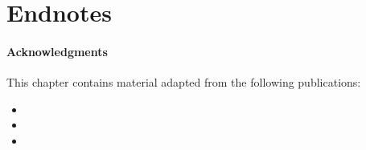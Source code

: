 \section*{Endnotes}
\paragraph{Acknowledgments}
This chapter contains material adapted from the following publications:
\begin{itemize}
\item {}
\item {}
\item {}
\end{itemize}



